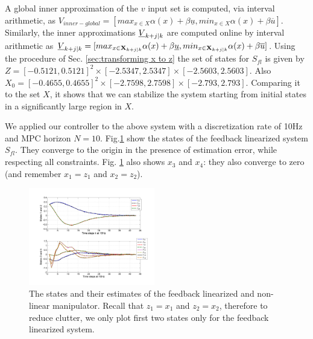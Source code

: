 A global inner approximation of the $v$ input set is computed, via interval arithmetic, as $V_{inner-global} = [max_{x\in X}\alpha(x) + \beta \underline{u}, min_{x\in X}\alpha(x) + \beta \overline{u}]$. 
Similarly, the inner approximations $\underline{V}_{k+j|k}$ are computed online by interval arithmetic as $\underline{V}_{k+j|k} = [max_{x\in \mathbf{X}_{k+j|k}} \alpha(x) + \beta \underline{u},  min_{x\in \mathbf{X}_{k+j|k}}\alpha(x) + \beta \overline{u}]$. 
Using the procedure of Sec. \ref{sec:transforming x to z} the set of states for $S_{fl}$ is given by $Z = [-0.5121, 0.5121]^2 \times [-2.5347, 2.5347] \times [-2.5603, 2.5603]$. Also $X_0 = [-0.4655,0.4655]^2 \times [-2.7598,2.7598] \times [-2.793,2.793]$. Comparing it to the set $X$, it shows that we can stabilize the system starting from initial states in a significantly large region in $X$.

We applied our controller to the above system with a discretization rate of 10Hz and MPC horizon $N=10$.
Fig.\ref{fig:AllStates_manip} show the states of the feedback linearized system $S_{fl}$. 
They converge to the origin in the presence of estimation error, while respecting all constraints.
Fig. \ref{fig:AllStates_manip} also shows $x_3$ and $x_4$: they also converge to zero (and remember $x_1 = z_1$ and $x_2 = z_2$).

\begin{figure}
\includegraphics[width=0.49\textwidth]{figs/AllStates_manip.pdf}
\caption{The states and their estimates of the feedback linearized and non-linear manipulator. Recall that $z_1 = x_1$ and $z_2=x_2$, therefore to reduce clutter, we only plot first two states only for the feedback linearized system.}
\label{fig:AllStates_manip}
\end{figure}




